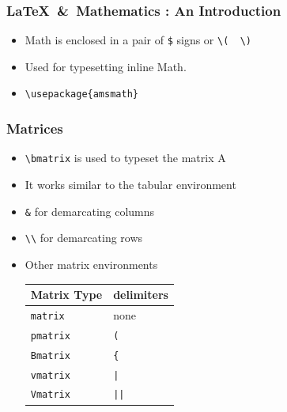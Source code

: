 \documentclass{beamer}
\begin{document}
\begin{frame}[fragile]
  \frametitle{\LaTeX\ \&\ Mathematics : An Introduction}
  \begin{itemize}
  \item Math is enclosed in a pair of \lstinline{$} signs or %
    \lstinline+\(  \)+ 
  \item Used for typesetting inline Math. 
  \item \lstinline+\usepackage{amsmath}+
  \end{itemize}
\end{frame}

\begin{frame}[fragile]
  \frametitle{Matrices}
  \begin{itemize}
  \item \lstinline+\bmatrix+ is used to typeset the matrix A
  \item It works similar to the tabular environment
  \item \lstinline+&+ for demarcating columns
  \item \lstinline+\\+ for demarcating rows
  \item Other matrix environments
  \begin{table}
    \center
    \begin{tabular}{|l|l|}
      \hline
        Matrix Type & delimiters \\
      \hline
      \lstinline+matrix+  &  none\\
      \hline
      \lstinline+pmatrix+ &  \lstinline+(+\\
      \hline
      \lstinline+Bmatrix+ &  \lstinline+{+\\
      \hline
      \lstinline+vmatrix+ &  \lstinline+|+\\  
      \hline
      \lstinline+Vmatrix+ &  \lstinline+||+\\
      \hline
    \end{tabular}
  \end{table}
  \end{itemize}
\end{frame}
\end{document}
